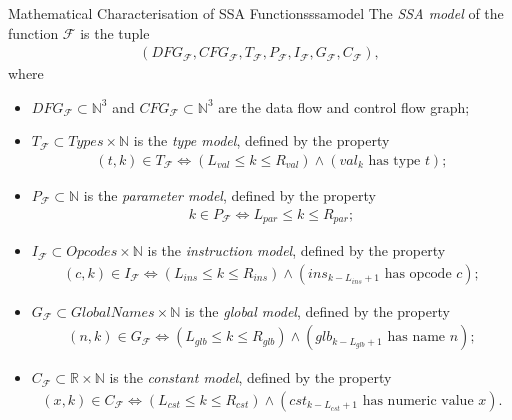 \begin{definition}{Mathematical Characterisation of SSA Functions}{ssamodel}
    The {\em SSA model} of the function $\mathcal F$ is the tuple
    \begin{align*}
        (DFG_\mathcal{F},
         CFG_\mathcal{F},
         T_\mathcal{F},
         P_\mathcal{F},
         I_\mathcal{F},
         G_\mathcal{F},
         C_\mathcal{F}),
    \end{align*}
    where
    \begin{itemize}
    \item $DFG_\mathcal{F}\subset\mathbb N^3$ and
          $CFG_\mathcal{F}\subset\mathbb N^3$ are the data flow and control
          flow graph;
    \item $T_\mathcal F\subset\textit{Types}\times\mathbb N$ is the {\it type model},
          defined by the property
          \begin{align*}
              (t,k)\in T_\mathcal F\iff\left(L_{val}\leq k\leq R_{val}\right)
                  \mathrel\land(val_k\text{ has type }t);
          \end{align*}
    \item $P_\mathcal F\subset\mathbb N$ is the {\it parameter model}, defined
          by the property
          \begin{align*}
              k\in P_\mathcal F\iff L_{par}\leq k\leq R_{par};
          \end{align*}
    \item $I_\mathcal F\subset\textit{Opcodes}\times \mathbb N$ is the
          {\it instruction model}, defined by the property
          \begin{align*}
              (c,k)\in I_\mathcal F\iff\left(L_{ins}\leq k\leq R_{ins}\right)
                  \mathrel{\land}(ins_{k-L_{ins}+1}\text{ has opcode }c);
          \end{align*}
    \item $G_\mathcal F\subset\textit{GlobalNames}\times\mathbb N$ is the
          {\it global model}, defined by the property
          \begin{align*}
              (n,k)\in G_\mathcal F\iff\left(L_{glb}\leq k\leq R_{glb}\right)
                  \mathrel{\land}(glb_{k-L_{glb}+1}\text{ has name }n);
          \end{align*}
    \item $C_\mathcal F\subset\mathbb R\times\mathbb N$ is the
          {\it constant model}, defined by the property
          \begin{align*}
              (x,k)\in C_\mathcal F\iff\left(L_{cst}\leq k\leq R_{cst}\right)
                  \mathrel{\land}(cst_{k-L_{cst}+1}\text{ has numeric value }x).
          \end{align*}
    \end{itemize}
\end{definition}

